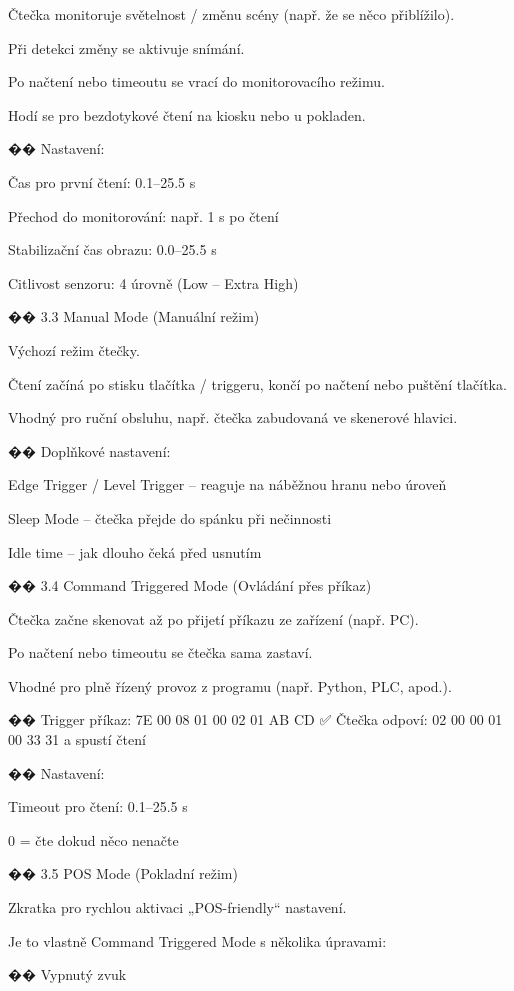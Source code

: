     Čtečka monitoruje světelnost / změnu scény (např. že se něco přiblížilo).

    Při detekci změny se aktivuje snímání.

    Po načtení nebo timeoutu se vrací do monitorovacího režimu.

    Hodí se pro bezdotykové čtení na kiosku nebo u pokladen.

��️ Nastavení:

    Čas pro první čtení: 0.1–25.5 s

    Přechod do monitorování: např. 1 s po čtení

    Stabilizační čas obrazu: 0.0–25.5 s

    Citlivost senzoru: 4 úrovně (Low – Extra High)

�� 3.3 Manual Mode (Manuální režim)

    Výchozí režim čtečky.

    Čtení začíná po stisku tlačítka / triggeru, končí po načtení nebo puštění tlačítka.

    Vhodný pro ruční obsluhu, např. čtečka zabudovaná ve skenerové hlavici.

��️ Doplňkové nastavení:

    Edge Trigger / Level Trigger – reaguje na náběžnou hranu nebo úroveň

    Sleep Mode – čtečka přejde do spánku při nečinnosti

    Idle time – jak dlouho čeká před usnutím

�� 3.4 Command Triggered Mode (Ovládání přes příkaz)

    Čtečka začne skenovat až po přijetí příkazu ze zařízení (např. PC).

    Po načtení nebo timeoutu se čtečka sama zastaví.

    Vhodné pro plně řízený provoz z programu (např. Python, PLC, apod.).

�� Trigger příkaz: 7E 00 08 01 00 02 01 AB CD
✅ Čtečka odpoví: 02 00 00 01 00 33 31 a spustí čtení

��️ Nastavení:

    Timeout pro čtení: 0.1–25.5 s

    0 = čte dokud něco nenačte

�� 3.5 POS Mode (Pokladní režim)

    Zkratka pro rychlou aktivaci „POS-friendly“ nastavení.

    Je to vlastně Command Triggered Mode s několika úpravami:

        �� Vypnutý zvuk

